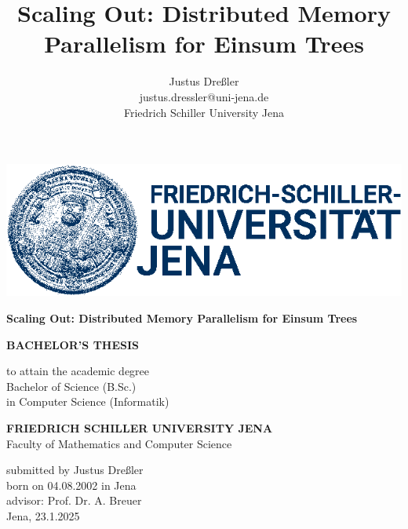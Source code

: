 \documentclass[a4paper, 12pt]{article}
\title{Scaling Out: Distributed Memory Parallelism for Einsum Trees}
\author{Justus Dreßler \\ justus.dressler@uni-jena.de \\ Friedrich Schiller University Jena}
\begin{document}
\thispagestyle{empty} 


    \begin{center}
        \includegraphics*[]{logo}
    \end{center}

    \vspace{40pt}

    \begin{center}
        \huge
        \textbf{Scaling Out: Distributed Memory Parallelism for Einsum Trees}
    \end{center}
    
    \vspace{20pt}

    \begin{center}
        \Large
        \textbf{BACHELOR'S THESIS}
    \end{center}


    \begin{center}
        \Large
        to attain the academic degree \\
        Bachelor of Science (B.Sc.) \\
        in Computer Science (Informatik)
    \end{center}

    \vspace{20pt}

    \begin{center}
        \large
        \textbf{FRIEDRICH SCHILLER UNIVERSITY JENA} \\
        Faculty of Mathematics and Computer Science \\
    \end{center}

    \vspace{20pt}

    \begin{center}
        \large
        submitted by Justus Dreßler \\
        born on 04.08.2002 in Jena \\
        advisor: Prof. Dr. A. Breuer \\
        Jena, 23.1.2025
    \end{center}
\end{document}
